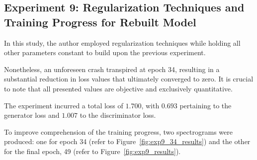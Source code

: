 \subsection{Experiment 9: Regularization Techniques and Training Progress for Rebuilt Model} \label{sec:exp9}

In this study, the author employed regularization techniques while holding all other parameters constant to build upon the previous experiment.

Nonetheless, an unforeseen crash transpired at epoch 34, resulting in a substantial reduction in loss values that ultimately converged to zero. It is crucial to note that all presented values are objective and exclusively quantitative.

The experiment incurred a total loss of $1.700$, with $0.693$ pertaining to the generator loss and $1.007$ to the discriminator loss.

To improve comprehension of the training progress, two spectrograms were produced: one for epoch 34 (refer to Figure~\ref{fig:exp9_34_results}) and the other for the final epoch, 49 (refer to Figure~\ref{fig:exp9_results}).


